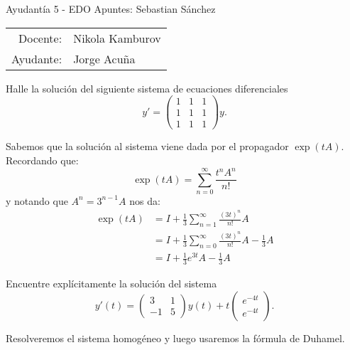 




{\sc Ayudantía 5 - EDO \hfill \small \rm Apuntes: Sebastian Sánchez}

\begin{center}
    \begin{tabular}{rl}
        Docente:& Nikola Kamburov\\
        Ayudante:& Jorge Acuña
    \end{tabular}
\end{center}

\begin{problema}
Halle la solución del siguiente sistema de ecuaciones diferenciales
\[
    y'
    =
    \begin{pmatrix}
    1 & 1 & 1 \\
    1 & 1 & 1 \\
    1 & 1 & 1
    \end{pmatrix}
    y
.\]
\end{problema}
Sabemos que la solución al sistema viene dada por el propagador \(\exp(tA)\).
Recordando que:
\[
    \exp(tA) = \sum_{n=0}^\infty \frac{t^n A^n}{n!}
\]
y notando que \(A^n = 3^{n-1} A\) nos da:
\begin{align*}
    \exp(tA)
    &=
    I + \frac{1}{3} \sum_{n=1}^{\infty} \frac{(3t)^n }{n!} A
    \\&=
    I + \frac{1}{3} \sum_{n=0}^{\infty} \frac{(3t)^n }{n!} A - \frac{1}{3} A
    \\&= I + \frac{1}{3} e^{3t} A  - \frac{1}{3} A
\end{align*}

\begin{problema}
Encuentre explícitamente la solución del sistema
\[
    y'(t) =
    \begin{pmatrix}
    3 & 1\\
    -1 & 5
    \end{pmatrix} y(t)
    +
    t
    \begin{pmatrix} e^{-4t} \\ e^{-4t} \end{pmatrix}
.\]
\end{problema}
Resolveremos el sistema homogéneo y luego usaremos la fórmula de Duhamel.

